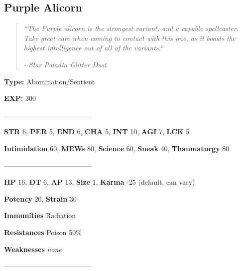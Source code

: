 \documentclass[11pt,a4paper,twocolumn]{book}
\begin{document}
	\subsection*{Purple Alicorn}
	\begin{quote}
		\emph{``The Purple alicorn is the strongest variant, and a capable spellcaster. Take great care when coming to contact with this one, as it boasts the highest intelligence out of all of the variants.``}
		
		\emph{-	Star Paladin Glitter Dust}
	\end{quote}
	
	\noindent
	\textbf{Type:} Abomination/Sentient
	
	\noindent
	\textbf{EXP:} 300
	
	--------------------------------------
	
	\noindent
	\textbf{STR} 6, \textbf{PER} 5, \textbf{END} 6, \textbf{CHA} 5, \textbf{INT} 10, \textbf{AGI} 7, \textbf{LCK} 5
	
	\noindent
	\textbf{Intimidation} 60, \textbf{MEWs} 80, \textbf{Science} 60, \textbf{Sneak} 40, \textbf{Thaumaturgy} 80
	
	--------------------------------------
	
	\noindent
	\textbf{HP} 16, \textbf{DT} 6, \textbf{AP} 13, \textbf{Size} 1, \textbf{Karma} -25 (default, can vary)
	
	\noindent
	\textbf{Potency} 20, \textbf{Strain} 30
	
	\noindent
	\textbf{Immunities} Radiation
	
	\noindent
	\textbf{Resistances} Poison 50\%
	
	\noindent
	\textbf{Weaknesses} \emph{none} %
	
	--------------------------------------
		
\end{document}
